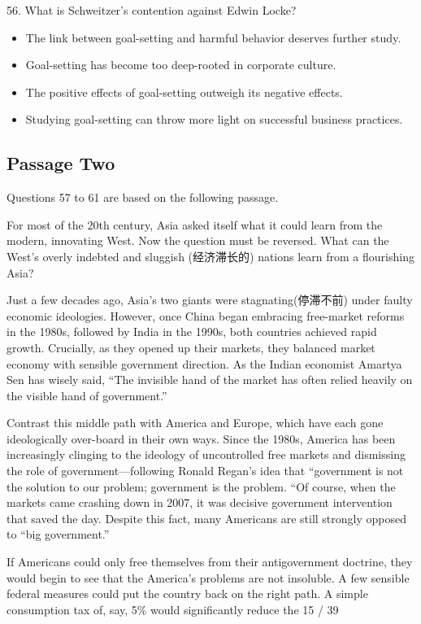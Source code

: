 \documentclass[UTF8,11pt]{ctexart}
\begin{document}
56. What is Schweitzer’s contention against Edwin Locke?


\begin{itemize}[leftmargin=2em,itemsep=.2em,topsep=.4em]\item[A.] The link between goal-setting and harmful behavior deserves further study.
\item[B.] Goal-setting has become too deep-rooted in corporate culture.
\item[C.] The positive effects of goal-setting outweigh its negative effects.
\item[D.] Studying goal-setting can throw more light on successful business practices.
\end{itemize}

\subsection*{\textbf{Passage Two}}


Questions 57 to 61 are based on the following passage.


For most of the 20th century, Asia asked itself what it could learn from the modern, innovating West. Now the question must be reversed. What can the West’s overly indebted and sluggish (经济滞长的) nations learn from a flourishing Asia?


Just a few decades ago, Asia’s two giants were stagnating(停滞不前) under faulty economic ideologies. However, once China began embracing free-market reforms in the 1980s, followed by India in the 1990s, both countries achieved rapid growth. Crucially, as they opened up their markets, they balanced market economy with sensible government direction. As the Indian economist Amartya Sen has wisely said, “The invisible hand of the market has often relied heavily on the visible hand of government.”


Contrast this middle path with America and Europe, which have each gone ideologically over-board in their own ways. Since the 1980s, America has been increasingly clinging to the ideology of uncontrolled free markets and dismissing the role of government---following Ronald Regan’s idea that “government is not the solution to our problem; government is the problem. “Of course, when the markets came crashing down in 2007, it was decisive government intervention that saved the day. Despite this fact, many Americans are still strongly opposed to “big government.”


If Americans could only free themselves from their antigovernment doctrine, they would begin to see that the America’s problems are not insoluble. A few sensible federal measures could put the country back on the right path. A simple consumption tax of, say, 5\% would significantly reduce the 15 / 39
\end{document}
